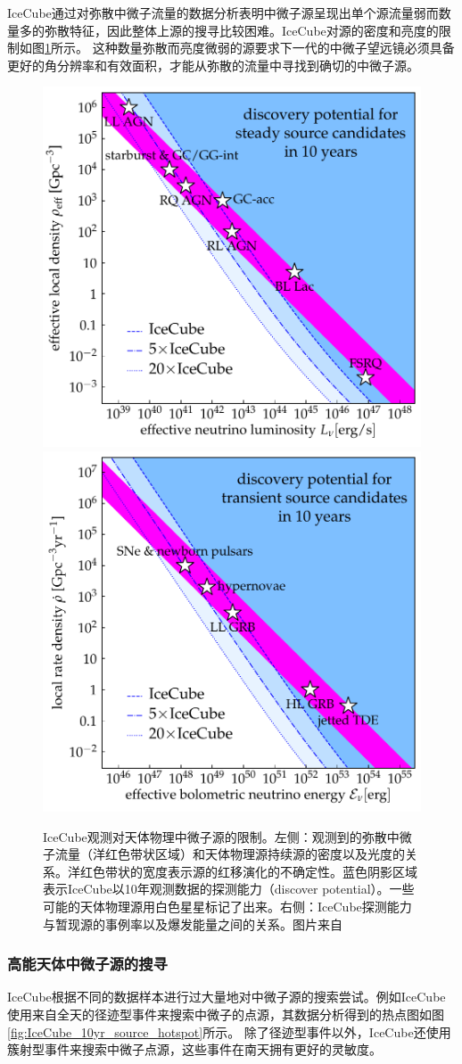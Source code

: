 IceCube通过对弥散中微子流量的数据分析表明中微子源呈现出单个源流量弱而数量多的弥散特征，因此整体上源的搜寻比较困难。IceCube对源的密度和亮度的限制如图\ref{fig:neutrino_sources}所示。
这种数量弥散而亮度微弱的源要求下一代的中微子望远镜必须具备更好的角分辨率和有效面积，才能从弥散的流量中寻找到确切的中微子源\cite{Fang_resolve_flux:2016}。

\begin{figure}[htbp]
    \centering
    \includegraphics[width=0.45\linewidth]{img/sources_steady.pdf}
    \includegraphics[width=0.45\linewidth]{img/sources_transient.pdf}
    \caption{IceCube观测对天体物理中微子源的限制。左侧：观测到的弥散中微子流量（洋红色带状区域）和天体物理源持续源的密度以及光度的关系。洋红色带状的宽度表示源的红移演化的不确定性。蓝色阴影区域表示IceCube以10年观测数据的探测能力（discover potential）。一些可能的天体物理源用白色星星标记了出来。右侧：IceCube探测能力与暂现源的事例率以及爆发能量之间的关系。图片来自\cite{Astro2020_neutrino}}
    \label{fig:neutrino_sources}
\end{figure}

\subsubsection{高能天体中微子源的搜寻}

IceCube根据不同的数据样本进行过大量地对中微子源的搜索尝试。例如IceCube使用来自全天的径迹型事件来搜索中微子的点源\cite{IceCube_10yr_point_source:2019}，其数据分析得到的热点图如图\ref{fig:IceCube_10yr_source_hotspot}所示。
除了径迹型事件以外，IceCube还使用簇射型事件来搜索中微子点源\cite{IceCube_7yr_cascade_source:2019}，这些事件在南天拥有更好的灵敏度。

